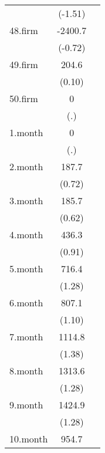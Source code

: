 {\begin{tabular}{l*{2}{c}}
            &     (-1.51)         &                     \\
[1em]
48.firm     &     -2400.7         &                     \\
            &     (-0.72)         &                     \\
[1em]
49.firm     &       204.6         &                     \\
            &      (0.10)         &                     \\
[1em]
50.firm     &           0         &                     \\
            &         (.)         &                     \\
[1em]
1.month     &           0         &                     \\
            &         (.)         &                     \\
[1em]
2.month     &       187.7         &                     \\
            &      (0.72)         &                     \\
[1em]
3.month     &       185.7         &                     \\
            &      (0.62)         &                     \\
[1em]
4.month     &       436.3         &                     \\
            &      (0.91)         &                     \\
[1em]
5.month     &       716.4         &                     \\
            &      (1.28)         &                     \\
[1em]
6.month     &       807.1         &                     \\
            &      (1.10)         &                     \\
[1em]
7.month     &      1114.8         &                     \\
            &      (1.38)         &                     \\
[1em]
8.month     &      1313.6         &                     \\
            &      (1.28)         &                     \\
[1em]
9.month     &      1424.9         &                     \\
            &      (1.28)         &                     \\
[1em]
10.month    &       954.7         &                     \\

\end{tabular}}
